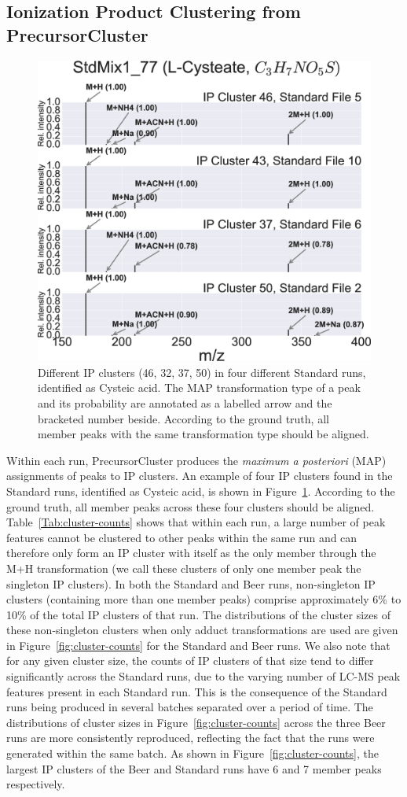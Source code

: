 \subsection{Ionization Product Clustering from PrecursorCluster\label{sub:precursor-cluster-results}}

\begin{figure}[!htbp]
\centering
\includegraphics[width=0.6\linewidth]{05-precursor-cluster/figures/l_cysteate.eps}
\caption{\label{fig:06} Different IP clusters (46, 32, 37, 50) in four different Standard runs, identified as Cysteic acid. The MAP transformation type of a peak and its probability are annotated as a labelled arrow and the bracketed number beside. According to the ground truth, all member peaks with the same transformation type should be aligned.}
\end{figure}

Within each run, PrecursorCluster produces the \textit{maximum a posteriori} (MAP) assignments of peaks to IP clusters. An example of four IP clusters found in the Standard runs, identified as Cysteic acid, is shown in Figure~\ref{fig:06}. According to the ground truth, all member peaks across these four clusters should be aligned. Table~\ref{Tab:cluster-counts} shows that within each run, a large number of peak features cannot be clustered to other peaks within the same run and can therefore only form an IP cluster with itself as the only member through the M+H transformation (we call these clusters of only one member peak the singleton IP clusters). In both the Standard and Beer runs, non-singleton IP clusters (containing more than one member peaks) comprise approximately 6\% to 10\% of the total IP clusters of that run. The distributions of the cluster sizes of these non-singleton clusters when only adduct transformations are used are given in Figure~\ref{fig:cluster-counts} for the Standard and Beer runs. We also note that for any given cluster size, the counts of IP clusters of that size tend to differ significantly across the Standard runs, due to the varying number of LC-MS peak features present in each Standard run. This is the consequence of the Standard runs being produced in several batches separated over a period of time. The distributions of cluster sizes in Figure~\ref{fig:cluster-counts} across the three Beer runs are more consistently reproduced, reflecting the fact that the runs were generated within the same batch. As shown in Figure~\ref{fig:cluster-counts}, the largest IP clusters of the Beer and Standard runs have 6 and 7 member peaks respectively. 

